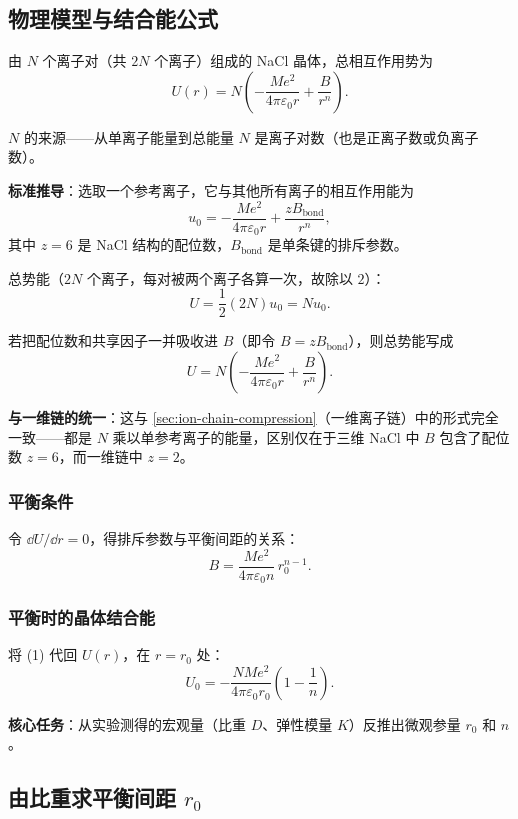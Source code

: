 \subsection{物理模型与结合能公式}

由 $N$ 个离子对（共 $2N$ 个离子）组成的 NaCl 晶体，总相互作用势为
\[
  U(r) = N\left(-\frac{Me^2}{4\pi\varepsilon_0 r} + \frac{B}{r^n}\right).
\]

\begin{insightbox}{$N$ 的来源——从单离子能量到总能量}
$N$ 是离子对数（也是正离子数或负离子数）。

\textbf{标准推导}：选取一个参考离子，它与其他所有离子的相互作用能为
\[
  u_0 = -\frac{Me^2}{4\pi\varepsilon_0 r} + \frac{z B_{\text{bond}}}{r^n},
\]
其中 $z=6$ 是 NaCl 结构的配位数，$B_{\text{bond}}$ 是单条键的排斥参数。

总势能（$2N$ 个离子，每对被两个离子各算一次，故除以 $2$）：
\[
  U = \frac{1}{2}(2N) u_0 = N u_0.
\]

若把配位数和共享因子一并吸收进 $B$（即令 $B = z B_{\text{bond}}$），则总势能写成
\[
  U = N\left(-\frac{Me^2}{4\pi\varepsilon_0 r} + \frac{B}{r^n}\right).
\]

\textbf{与一维链的统一}：这与 \ref{sec:ion-chain-compression}（一维离子链）中的形式完全一致——都是 $N$ 乘以单参考离子的能量，区别仅在于三维 NaCl 中 $B$ 包含了配位数 $z=6$，而一维链中 $z=2$。
\end{insightbox}

\subsubsection{平衡条件}

令 $\dd U/\dd r = 0$，得排斥参数与平衡间距的关系：
\[
  B = \frac{Me^2}{4\pi\varepsilon_0 n}\, r_0^{n-1}. \tag{1}
\]

\subsubsection{平衡时的晶体结合能}

将 (1) 代回 $U(r)$，在 $r = r_0$ 处：
\[
  U_0 = -\frac{NMe^2}{4\pi\varepsilon_0 r_0}\left(1 - \frac{1}{n}\right). \tag{2}
\]

\textbf{核心任务}：从实验测得的宏观量（比重 $D$、弹性模量 $K$）反推出微观参量 $r_0$ 和 $n$。

\subsection{由比重求平衡间距 $r_0$}

